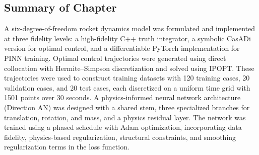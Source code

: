 \subsection{Summary of Chapter}

A six-degree-of-freedom rocket dynamics model was formulated and implemented at
three fidelity levels: a high-fidelity C++ truth integrator, a symbolic CasADi
version for optimal control, and a differentiable PyTorch implementation for
PINN training. Optimal control trajectories were generated using direct
collocation with Hermite--Simpson discretization and solved using IPOPT. These
trajectories were used to construct training datasets with 120 training cases, 20
validation cases, and 20 test cases, each discretized on a uniform time grid
with 1501 points over 30 seconds. A physics-informed neural network architecture
(Direction AN) was designed with a shared stem, three specialized branches for
translation, rotation, and mass, and a physics residual layer. The network was
trained using a phased schedule with Adam optimization, incorporating data
fidelity, physics-based regularization, structural constraints, and smoothing
regularization terms in the loss function.

